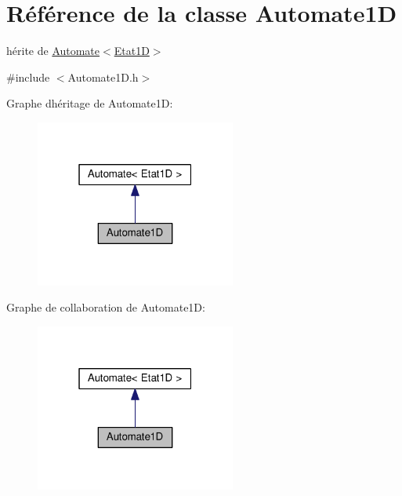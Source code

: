 \hypertarget{class_automate1_d}{}\section{Référence de la classe Automate1D}
\label{class_automate1_d}


hérite de \hyperlink{class_automate}{Automate$<$\+Etat1\+D$>$}  




{\ttfamily \#include $<$Automate1\+D.\+h$>$}



Graphe d\textquotesingle{}héritage de Automate1D\+:\nopagebreak
\begin{figure}[H]
\begin{center}
\leavevmode
\includegraphics[width=187pt]{class_automate1_d__inherit__graph}
\end{center}
\end{figure}


Graphe de collaboration de Automate1D\+:\nopagebreak
\begin{figure}[H]
\begin{center}
\leavevmode
\includegraphics[width=187pt]{class_automate1_d__coll__graph}
\end{center}
\end{figure}
